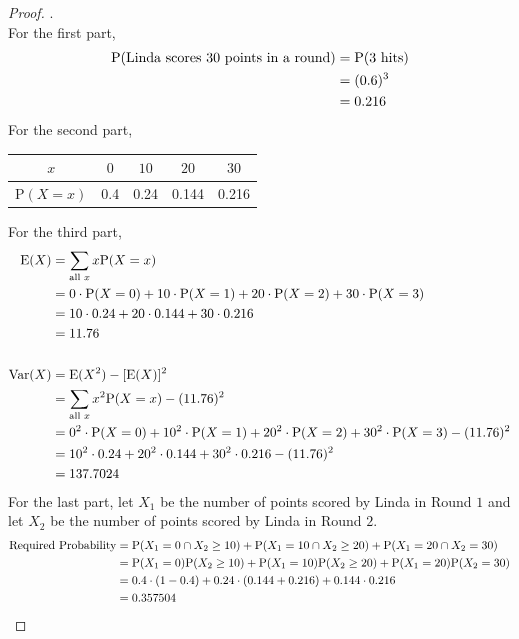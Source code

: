 \documentclass[../setup.tex]{subfiles}
\begin{document}
\begin{proof} . \\
For the first part,
\begin{align*}
\textup{P}(\text{Linda scores 30 points in a round}) &= \textup{P}(3 \text{ hits}) \\
&= (0.6)^3 \\
&= 0.216 \\
\end{align*}
For the second part, \\
\begin{tabular}{| c | c | c | c | c |}
\hline
$x$ & $0$ & $10$ & $20$ & $30$ \\
\hline
\textup{P}$(X=x)$ & 0.4 & 0.24 & 0.144 & 0.216 \\
\hline
\end{tabular}
For the third part,
\begin{align*}
\textup{E}(X) &= \sum_{\text{all }x} x\textup{P}(X=x) \\
&= 0\cdot\textup{P}(X=0) + 10\cdot\textup{P}(X=1) + 20\cdot\textup{P}(X=2) + 30\cdot\textup{P}(X=3) \\
&= 10\cdot 0.24+ 20\cdot 0.144 + 30\cdot 0.216 \\
&= 11.76 \\ \\
\textup{Var}(X) &= \textup{E}(X^2) - [\textup{E}(X)]^2 \\
&= \sum_{\text{all }x} x^2\textup{P}(X=x) - (11.76)^2 \\
&= 0^2\cdot\textup{P}(X=0) + 10^2\cdot\textup{P}(X=1) + 20^2\cdot\textup{P}(X=2) + 30^2\cdot\textup{P}(X=3) - (11.76)^2 \\
&= 10^2\cdot 0.24 + 20^2\cdot 0.144 + 30^2\cdot 0.216 - (11.76)^2 \\
&= 137.7024 \\
\end{align*}
\clearpage
For the last part, let $X_1$ be the number of points scored by Linda in Round $1$ and let $X_2$ be the number of points scored by Linda in Round $2$.
\begin{align*}
\text{Required Probability} &= \textup{P}(X_1=0\cap X_2\geq10)+\textup{P}(X_1=10\cap X_2\geq20)+ \textup{P}(X_1=20\cap X_2=30) \\
&=\textup{P}(X_1=0)\textup{P}(X_2\geq10) + \textup{P}(X_1=10)\textup{P}(X_2\geq20)+ \textup{P}(X_1=20)\textup{P}(X_2=30) \\
&= 0.4\cdot(1-0.4) + 0.24\cdot(0.144+0.216) + 0.144\cdot0.216 \\
&= 0.357504
\end{align*}
\end{proof}
\end{document}
